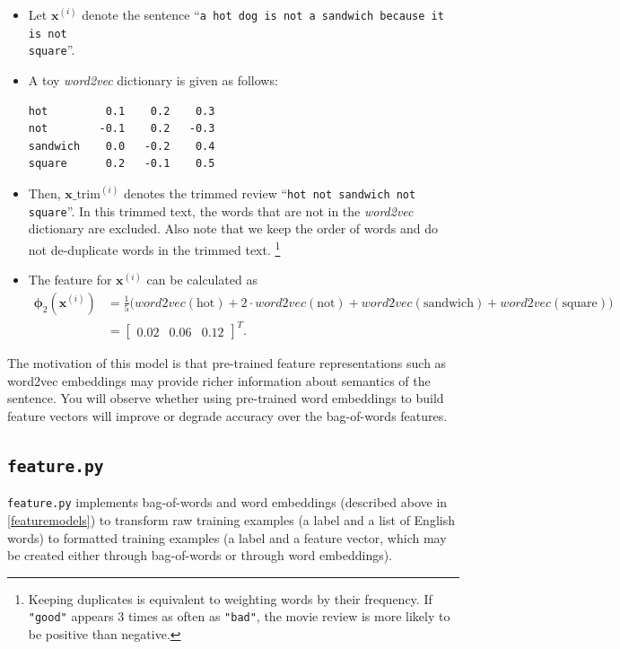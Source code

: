 \documentclass[11pt,addpoints,answers]{exam}
\newcommand{\xv}{\mathbf{x}}
\begin{document}
\begin{itemize}
    \item Let $\xv^{(i)}$ denote the sentence ``\texttt{a hot dog is not a sandwich because it is not\\ square}''.
    \item A toy \emph{word2vec} dictionary is given as follows: 
    \begin{lstlisting}
hot         0.1    0.2    0.3
not        -0.1    0.2   -0.3
sandwich    0.0   -0.2    0.4
square      0.2   -0.1    0.5
    \end{lstlisting}
    \item Then, $\xv\_\text{trim}^{(i)}$ denotes the trimmed review ``\texttt{hot not sandwich not square}''. In this trimmed text, the words that are not in the \emph{word2vec} dictionary are excluded. Also note that we keep the order of words and do not de-duplicate words in the trimmed text. \footnote{Keeping duplicates is equivalent to weighting words by their frequency. If \lstinline{"good"} appears 3 times as often as \lstinline{"bad"}, the movie review is more likely to be positive than negative.}
    \item The feature for $\xv^{(i)}$ can be calculated as
        \begin{align*} \boldsymbol{\phi}_2(\xv^{(i)}) &= \frac{1}{5}\big( word2vec(\text{hot}) + 2 \cdot word2vec(\text{not}) + word2vec(\text{sandwich}) + word2vec(\text{square}) \big) \\
        &= \begin{bmatrix} 0.02 & 0.06 & 0.12 \end{bmatrix}^T.
        \end{align*}
\end{itemize}


The motivation of this model is that pre-trained feature representations such as word2vec embeddings may provide richer information about semantics of the sentence. You will observe whether using pre-trained word embeddings to build feature vectors will improve or degrade accuracy over the bag-of-words features. 


\subsection{\texttt{feature.py}}\label{featurepy}

\lstinline{feature.py} implements bag-of-words and word embeddings (described above in \ref{featuremodels}) to transform raw training examples (a label and a list of English words) to formatted training examples (a label and a feature vector, which may be created either through bag-of-words or through word embeddings).
\end{document}
